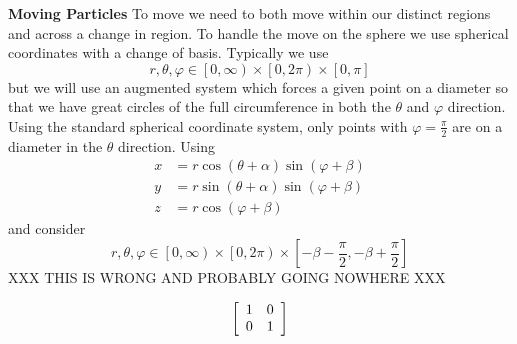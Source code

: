 \documentclass[a4paper,10pt]{article}
\begin{document}
\textbf{Moving Particles} To move we need to both move within our distinct
regions and across a change in region. To handle the move on the sphere
we use spherical coordinates with a change of basis. Typically we use
\[r, \theta, \varphi \in \left[0, \infty\right) \times \left[0, 2\pi\right)
\times \left[0, \pi\right]\]
but we will use an augmented system which forces a given point on a diameter
so that we have great circles of the full circumference in both the
\(\theta\) and \(\varphi\) direction. Using the standard spherical
coordinate  system, only points with \(\varphi = \frac{\pi}{2}\) are on
a diameter in the \(\theta\) direction. Using
\begin{align*}
x &= r \cos \left(\theta + \alpha\right) \sin \left(\varphi + \beta\right) \\
y &= r \sin \left(\theta + \alpha\right) \sin \left(\varphi + \beta\right) \\
z &= r \cos \left(\varphi + \beta\right)
\end{align*}
and consider
\[r, \theta, \varphi \in \left[0, \infty\right) \times \left[0, 2\pi\right)
\times \left[-\beta - \frac{\pi}{2}, -\beta + \frac{\pi}{2}\right]\]
XXX THIS IS WRONG AND PROBABLY GOING NOWHERE XXX

\[\left[ \begin{array}{c c}
1 & 0 \\
0 & 1
\end{array}\right]\]
\end{document}
